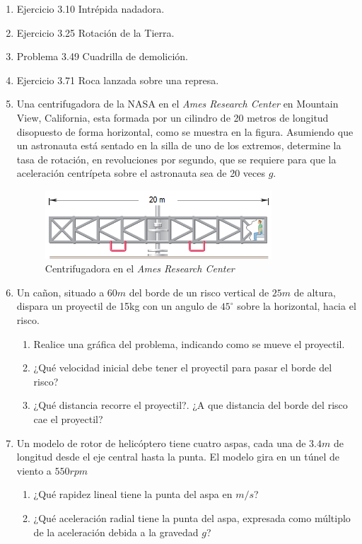 \documentclass[letterpaper,10pt,onecolumn]{article}
\begin{document}
\begin{enumerate}
\item Ejercicio 3.10 Intr\'epida nadadora.
\item Ejercicio 3.25 Rotaci\'on de la Tierra.
\item Problema 3.49 Cuadrilla de demolici\'on.

\item Ejercicio 3.71 Roca lanzada sobre una represa. %

\item Una centrifugadora de la NASA en el {\it Ames Research
Center} en Mountain View, California, esta formada por un cilindro de 20 metros de longitud disopuesto de forma horizontal, como se muestra en la figura. Asumiendo que un astronauta está sentado en la silla de uno de los extremos, determine la tasa de rotación, en revoluciones por segundo, que se requiere para que la aceleración centrípeta sobre el astronauta sea de 20 veces $g$.

\begin{figure}[h]
\centering
\includegraphics[width=0.8\textwidth]{astronauta.PNG}
\caption{Centrifugadora en el {\it Ames Research Center}}
\end{figure}


\item
Un cañon, situado a $60m$ del borde de un risco vertical de $25m$ de altura, dispara un proyectil de 15kg con un angulo de $45^{\circ}$ sobre la horizontal, hacia el risco.
\begin{enumerate}
\item Realice una gráfica del problema, indicando como se mueve el proyectil.
\item ¿Qué velocidad inicial debe tener el proyectil para pasar el borde del risco?
\item ¿Qué distancia recorre el proyectil?. ¿A que distancia del borde del risco cae el proyectil?
\end{enumerate} 



\item
Un modelo de rotor de helicóptero tiene cuatro aspas, cada una de $3.4m$ de longitud desde el eje central hasta la punta. El modelo gira en un túnel de viento a $550rpm$
\begin{enumerate}
\item 
¿Qué rapidez lineal tiene la punta del aspa en $m/s$?
\item
¿Qué aceleración radial tiene la punta del aspa, expresada como múltiplo de la aceleración debida a la gravedad $g$?
\end{enumerate}
\end{enumerate}
\end{document}
